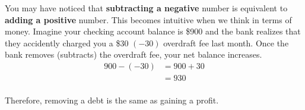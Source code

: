 \documentclass{ximera}[font=12pt]
\begin{document}
You may have noticed that \textbf{subtracting a negative} number is equivalent to \textbf{adding a positive} number.  
This becomes intuitive when we think in terms of money.  Imagine your checking account balance is \$900 and the 
bank realizes that they accidently charged you a \$30 $(-30)$ overdraft fee last month.  Once the bank removes 
(subtracts) the overdraft fee, your net balance increases. \\

\begin{align*}
900-(-30) &= 900 + 30 \\
          &= 930 \\
\end{align*}

Therefore, removing a debt is the same as gaining a profit.
\end{document}

